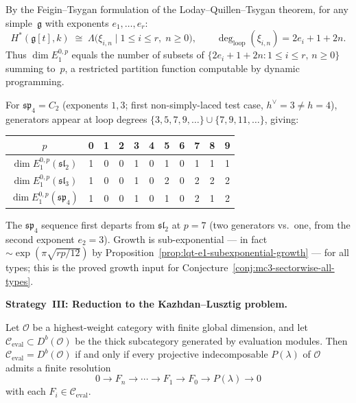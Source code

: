 \begin{computation}
\label{comp:current-algebra-E1-all-types}
By the Feigin--Tsygan formulation of the
Loday--Quillen--Tsygan theorem, for any simple~$\mathfrak{g}$
with exponents $e_1, \ldots, e_r$:
\[
H^*(\mathfrak{g}[t], k)
\;\cong\;
\Lambda\bigl(\xi_{i,n} \mid
  1 \le i \le r,\; n \ge 0\bigr),
\qquad
\deg_{\mathrm{loop}}(\xi_{i,n}) = 2e_i + 1 + 2n.
\]
Thus $\dim E_1^{0,p}$ equals the number of subsets
of $\{2e_i + 1 + 2n : 1 \le i \le r,\, n \ge 0\}$
summing to~$p$, a restricted partition function computable
by dynamic programming.

For $\mathfrak{sp}_4 = C_2$ (exponents $1, 3$;
first non-simply-laced test case,
$h^\vee = 3 \neq h = 4$), generators appear at loop degrees
$\{3, 5, 7, 9, \ldots\} \cup \{7, 9, 11, \ldots\}$, giving:
\begin{center}
\begin{tabular}{c|cccccccccc}
$p$ & 0 & 1 & 2 & 3 & 4 & 5 & 6 & 7 & 8 & 9 \\
\hline
$\dim E_1^{0,p}(\mathfrak{sl}_2)$
  & 1 & 0 & 0 & 1 & 0 & 1 & 0 & 1 & 1 & 1 \\
$\dim E_1^{0,p}(\mathfrak{sl}_3)$
  & 1 & 0 & 0 & 1 & 0 & 2 & 0 & 2 & 2 & 2 \\
$\dim E_1^{0,p}(\mathfrak{sp}_4)$
  & 1 & 0 & 0 & 1 & 0 & 1 & 0 & 2 & 1 & 2 \\
\end{tabular}
\end{center}
The $\mathfrak{sp}_4$ sequence first departs from
$\mathfrak{sl}_2$ at $p = 7$ (two generators vs.\ one,
from the second exponent $e_2 = 3$).  Growth is sub-exponential
--- in fact $\sim \exp(\pi\sqrt{rp/12})$ by
Proposition~\ref{prop:lqt-e1-subexponential-growth} ---
for all types; this is the proved growth input for
Conjecture~\textup{\ref{conj:mc3-sectorwise-all-types}}.
\end{computation}

\medskip

\noindent\textbf{Strategy~III\@: Reduction to the
Kazhdan--Lusztig problem.}

\begin{proposition}
\label{prop:thick-gen-projective}
Let $\mathcal{O}$ be a highest-weight category with finite global
dimension, and let $\mathcal{C}_{\mathrm{eval}} \subset
D^b(\mathcal{O})$ be the thick subcategory generated by evaluation
modules.  Then $\mathcal{C}_{\mathrm{eval}} = D^b(\mathcal{O})$ if
and only if every projective indecomposable $P(\lambda)$ of
$\mathcal{O}$ admits a finite resolution
\begin{equation}\label{eq:proj-eval-resolution}
0 \to F_n \to \cdots \to F_1 \to F_0 \to P(\lambda) \to 0
\end{equation}
with each $F_i \in \mathcal{C}_{\mathrm{eval}}$.
\end{proposition}

